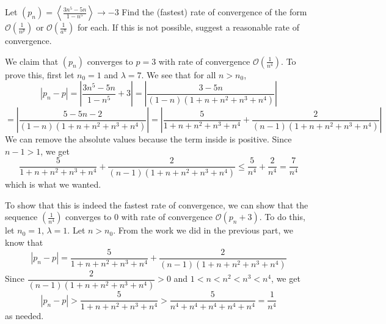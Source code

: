 \documentclass{article}
\theoremstyle{plain} %
\numberwithin{thm}{section} %
\theoremstyle{definition}
\begin{document}
    \begin{question}{5}
        Let \((p_n) = \left\langle \frac{3n^5 - 5n}{1 - n^5} \right\rangle \to -3\) Find the (fastest) rate of convergence of the form \(\mathcal{O}\left(\frac{1}{n^p}\right)\) or \(\mathcal{O}\left(\frac{1}{a^n}\right)\) for each. If this is not possible, suggest a reasonable rate of convergence.

        We claim that \((p_n)\) converges to \(p = 3\) with rate of convergence \(\mathcal{O} \left(\frac{1}{n^4}\right)\). To prove this, first let \(n_0 = 1\) and \(\lambda = 7\). We see that for all \(n > n_0\),
        \[
            |p_n - p| = \left\vert \frac{3n^5 - 5n}{1 - n^5} + 3 \right\vert = \left\vert \frac{3 - 5n}{(1 - n)(1 + n + n^2 + n^3 + n^4)} \right\vert
        \]
        \[
            = \left\vert \frac{5 - 5n - 2}{(1 - n)(1 + n + n^2 + n^3 + n^4)} \right\vert = \left\vert \frac{5}{1 + n + n^2 + n^3 + n^4} + \frac{2}{(n - 1)(1 + n + n^2 + n^3 + n^4)} \right\vert
        \]
        We can remove the absolute values because the term inside is positive. Since \(n - 1 > 1\), we get
        \[
            \frac{5}{1 + n + n^2 + n^3 + n^4} + \frac{2}{(n - 1)(1 + n + n^2 + n^3 + n^4)} \leq \frac{5}{n^4} + \frac{2}{n^4} = \frac{7}{n^4}
        \]
        which is what we wanted.

        To show that this is indeed the fastest rate of convergence, we can show that the sequence \(\left( \frac{1}{n^4} \right)\) converges to 0 with rate of convergence \(\mathcal{O} \left( p_n + 3 \right)\). To do this, let \(n_0 = 1\), \(\lambda = 1\). Let \(n > n_0\). From the work we did in the previous part, we know that
        \[
            |p_n - p| = \frac{5}{1 + n + n^2 + n^3 + n^4} + \frac{2}{(n - 1)(1 + n + n^2 + n^3 + n^4)}
        \]
        Since \(\dfrac{2}{(n-1)(1 + n + n^2 + n^3 + n^4)} > 0\) and \(1 < n < n^2 < n^3 < n^4\), we get
        \[
            |p_n - p| > \frac{5}{1 + n + n^2 + n^3 + n^4} > \frac{5}{n^4 + n^4 + n^4 + n^4 + n^4} = \frac{1}{n^4}
        \]
        as needed.
    \end{question}
    \newpage
\end{document}
